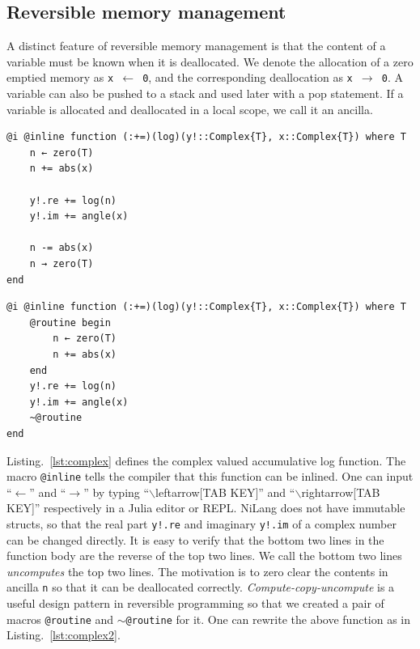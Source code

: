 \documentclass{article}
\newcommand{\<}{\langle}
\renewcommand{\>}{\rangle}
\newcommand{\Lst}[1]{Listing.~\ref{#1}}
\theoremstyle{definition}\newtheorem{definition}{\textit{Definition}}
\begin{document}
\subsection{Reversible memory management}
    A distinct feature of reversible memory management is that the content of a variable must be known when it is deallocated.
    We denote the allocation of a zero emptied memory as \texttt{x $\leftarrow$ 0}, and the corresponding deallocation as \texttt{x $\rightarrow$ 0}.
    A variable can also be pushed to a stack and used later with a pop statement.
    If a variable is allocated and deallocated in a local scope, we call it an ancilla.

\begin{minipage}{.45\columnwidth}
\begin{lstlisting}[mathescape=true,caption={Reversible complex valued log function $y\mathrel{+}=\log(|x|) + i{\rm Arg}(x)$.},label={lst:complex}]
@i @inline function (:+=)(log)(y!::Complex{T}, x::Complex{T}) where T
    n ← zero(T)
    n += abs(x)

    y!.re += log(n)
    y!.im += angle(x)

    n -= abs(x)
    n → zero(T)
end
\end{lstlisting}
\end{minipage}\hfill
\begin{minipage}{.45\columnwidth}
    \begin{lstlisting}[mathescape=true,caption={Compute-copy-uncompute version of \Lst{lst:complex}},label={lst:complex2}]
@i @inline function (:+=)(log)(y!::Complex{T}, x::Complex{T}) where T
    @routine begin
        n ← zero(T)
        n += abs(x)
    end
    y!.re += log(n)
    y!.im += angle(x)
    ~@routine
end
\end{lstlisting}
\end{minipage}

\Lst{lst:complex} defines the complex valued accumulative log function.
The macro \texttt{@inline} tells the compiler that this function can be inlined. One can input ``$\leftarrow$'' and ``$\rightarrow$'' by typing ``$\backslash$leftarrow[TAB KEY]'' and ``$\backslash$rightarrow[TAB KEY]'' respectively in a Julia editor or REPL.
NiLang does not have immutable structs, so that the real part \texttt{y!.re} and imaginary \texttt{y!.im} of a complex number can be changed directly.
It is easy to verify that the bottom two lines in the function body are the reverse of the top two lines. We call the bottom two lines \textit{uncomputes} the top two lines.
The motivation is to zero clear the contents in ancilla \texttt{n} so that it can be deallocated correctly.
\textit{Compute-copy-uncompute} is a useful design pattern in reversible programming so that we created a pair of macros \texttt{@routine} and \texttt{$\sim$@routine} for it. One can rewrite the above function as in \Lst{lst:complex2}.
\end{document}
